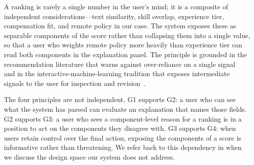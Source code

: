 A ranking is rarely a single number in the user's mind; it is a composite of independent considerations---text similarity, skill overlap, experience tier, compensation fit, and remote policy in our case.
The system exposes these as separable components of the score rather than collapsing them into a single value, so that a user who weights remote policy more heavily than experience tier can read both components in the explanation panel.
The principle is grounded in the recommendation literature that warns against over-reliance on a single signal~\cite{ziegler2005improving,tintarev2015explaining} and in the interactive-machine-learning tradition that exposes intermediate signals to the user for inspection and revision~\cite{kulesza2015principles,amershi2014power}.

The four principles are not independent.
G1 supports G2: a user who can see what the system has parsed can evaluate an explanation that names those fields.
G2 supports G3: a user who sees a component-level reason for a ranking is in a position to act on the components they disagree with.
G3 supports G4: when users retain control over the final action, exposing the components of a score is informative rather than threatening.
We refer back to this dependency in  when we discuss the design space our system does not address.
